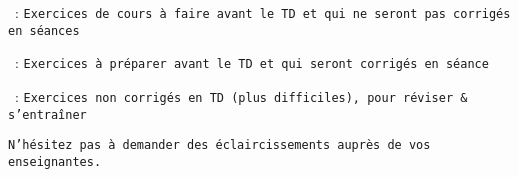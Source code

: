 
\soft~: \texttt{Exercices de cours à faire avant le TD et qui ne seront pas corrigés en séances}


\medium~: \texttt{Exercices à préparer avant le TD et qui seront corrigés en séance}


\hard~: \texttt{Exercices non corrigés en TD (plus difficiles), pour réviser \& s'entraîner}

\vspace{0.2cm}

\texttt{N'hésitez pas à demander des éclaircissements auprès de vos enseignant\textperiodcentered e\textperiodcentered s.}
